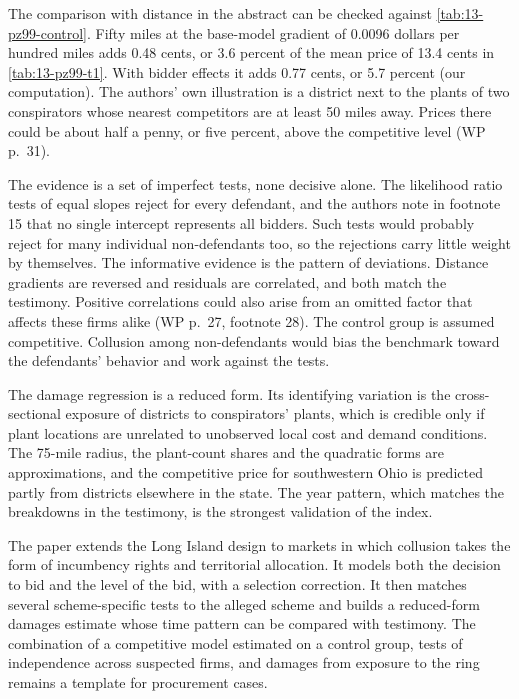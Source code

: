 The comparison with distance in the abstract can be checked against \cref{tab:13-pz99-control}. Fifty miles at the
base-model gradient of 0.0096 dollars per hundred miles adds 0.48 cents, or 3.6 percent of the mean price of 13.4
cents in \cref{tab:13-pz99-t1}. With bidder effects it adds 0.77 cents, or 5.7 percent (our computation). The authors'
own illustration is a district next to the plants of two conspirators whose nearest competitors are at least 50
miles away. Prices there could be about half a penny, or five percent, above the competitive level (WP p.~31).

The evidence is a set of imperfect tests, none decisive alone. The likelihood ratio tests of equal slopes reject for
every defendant, and the authors note in footnote 15 that no single intercept represents all bidders. Such tests
would probably reject for many individual non-defendants too, so the rejections carry little weight by themselves.
The informative evidence is the pattern of deviations. Distance gradients are reversed and residuals are
correlated, and both match the testimony. Positive correlations could also arise from an omitted factor that affects
these firms alike (WP p.~27, footnote 28). The control group is assumed competitive. Collusion among non-defendants
would bias the benchmark toward the defendants' behavior and work against the tests.

The damage regression is a reduced form. Its identifying variation is the cross-sectional exposure of districts to
conspirators' plants, which is credible only if plant locations are unrelated to unobserved local cost and demand
conditions. The 75-mile radius, the plant-count shares and the quadratic forms are approximations, and the
competitive price for southwestern Ohio is predicted partly from districts elsewhere in the state. The year
pattern, which matches the breakdowns in the testimony, is the strongest validation of the index.

The paper extends the Long Island design to markets in which collusion takes the form of incumbency rights and
territorial allocation. It models both the decision to bid and the level of the bid, with a selection correction. It
then matches several scheme-specific tests to the alleged scheme and builds a reduced-form damages estimate whose
time pattern can be compared with testimony. The combination of a competitive model estimated on a control group,
tests of independence across suspected firms, and damages from exposure to the ring remains a template for
procurement cases.

